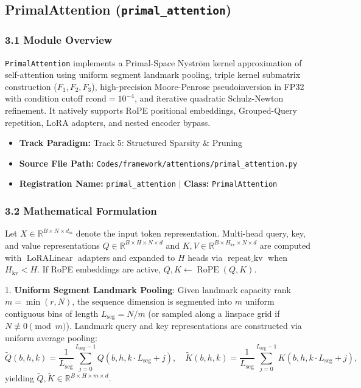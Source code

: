 \subsection{PrimalAttention (\texttt{primal\_attention})}
\label{sec:app_module_primal_attention}

\subsubsection*{3.1 Module Overview}
\texttt{PrimalAttention} implements a Primal-Space Nystr\"om kernel approximation of self-attention using uniform segment landmark pooling, triple kernel submatrix construction ($F_1, F_2, F_3$), high-precision Moore-Penrose pseudoinversion in FP32 with condition cutoff $\text{rcond}=10^{-4}$, and iterative quadratic Schulz-Newton refinement. It natively supports RoPE positional embeddings, Grouped-Query repetition, LoRA adapters, and nested encoder bypass.
\begin{itemize}
    \item \textbf{Track Paradigm:} Track 5: Structured Sparsity \& Pruning
    \item \textbf{Source File Path:} \texttt{Codes/framework/attentions/primal\_attention.py}
    \item \textbf{Registration Name:} \texttt{primal\_attention} $\mid$ \textbf{Class:} \texttt{PrimalAttention}
\end{itemize}

\subsubsection*{3.2 Mathematical Formulation}
Let $X \in \mathbb{R}^{B \times N \times d_{\text{in}}}$ denote the input token representation. Multi-head query, key, and value representations $Q \in \mathbb{R}^{B \times H \times N \times d}$ and $K, V \in \mathbb{R}^{B \times H_{\text{kv}} \times N \times d}$ are computed with $\operatorname{LoRALinear}$ adapters and expanded to $H$ heads via $\operatorname{repeat\_kv}$ when $H_{\text{kv}} < H$. If RoPE embeddings are active, $Q, K \leftarrow \operatorname{RoPE}(Q, K)$.

1. \textbf{Uniform Segment Landmark Pooling}:
Given landmark capacity rank $m = \min(r, N)$, the sequence dimension is segmented into $m$ uniform contiguous bins of length $L_{\text{seg}} = N / m$ (or sampled along a linspace grid if $N \not\equiv 0 \pmod m$). Landmark query and key representations are constructed via uniform average pooling:
\begin{equation}
\widetilde{Q}(b, h, k) = \frac{1}{L_{\text{seg}}} \sum_{j=0}^{L_{\text{seg}}-1} Q(b, h, k \cdot L_{\text{seg}} + j), \quad \widetilde{K}(b, h, k) = \frac{1}{L_{\text{seg}}} \sum_{j=0}^{L_{\text{seg}}-1} K(b, h, k \cdot L_{\text{seg}} + j),
\end{equation}
yielding $\widetilde{Q}, \widetilde{K} \in \mathbb{R}^{B \times H \times m \times d}$.


